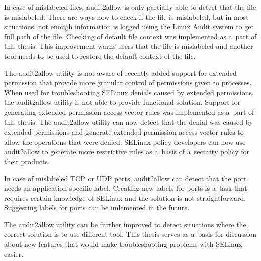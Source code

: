 In case of mislabeled files, audit2allow is only partially able to detect that
the file is mislabeled. There are ways how to check if the file is mislabeled,
but in most situations, not enough information is logged using the Linux Audit
system to get full path of the file. Checking of default file context was
implemented as a~part of this thesis. This improvement warns users that the file
is mislabeled and another tool needs to be used to restore the default context
of the file.

The audit2allow utility is not aware of recently added support for extended
permission that provide more granular control of permissions given to processes.
When used for troubleshooting SELinux denials caused by extended permissions,
the audit2allow utility is not able to provide functional solution. Support for
generating extended permission access vector rules was implemented as a~part of
this thesis. The audit2allow utility can now detect that the denial was caused
by extended permissions and generate extended permission access vector rules to
allow the operations that were denied. SELinux policy developers can now use
audit2allow to generate more restrictive rules as a~basis of a~security policy
for their products.

In case of mislabeled TCP or UDP ports, audit2allow can detect that the port
needs an application-specific label. Creating new labels for ports is a~task
that requires certain knowledge of SELinux and the solution is not
straightforward. Suggesting labels for ports can be imlemented in the future.


The audit2allow utility can be further improved to detect situations where the
correct solution is to use different tool. This thesis serves as a~basis for
discussion about new features that would make troubleshooting problems with
SELinux easier.
